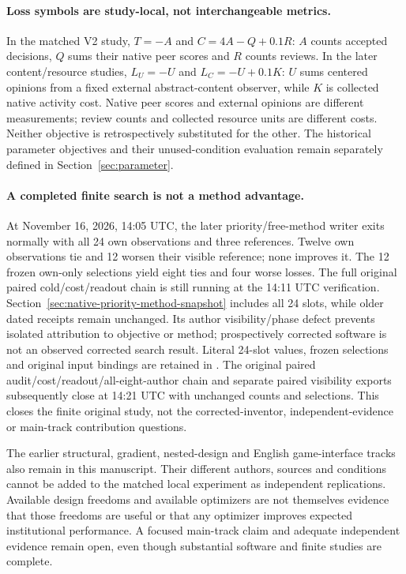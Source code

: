 \paragraph{Loss symbols are study-local, not interchangeable metrics.}
In the matched V2 study, $T=-A$ and $C=4A-Q+0.1R$: $A$ counts accepted
decisions, $Q$ sums their native peer scores and $R$ counts reviews. In the
later content/resource studies, $L_U=-U$ and $L_C=-U+0.1K$: $U$ sums centered
opinions from a fixed external abstract-content observer, while $K$ is
collected native activity cost. Native peer scores and external opinions are
different measurements; review counts and collected resource units are
different costs. Neither objective is retrospectively substituted for the
other. The historical parameter objectives and their unused-condition
evaluation remain separately defined in Section~\ref{sec:parameter}.

\paragraph{A completed finite search is not a method advantage.}
At November 16, 2026, 14:05 UTC, the later priority/free-method writer exits
normally with all 24 own observations and three references. Twelve own
observations tie and 12 worsen their visible reference; none improves it.
The 12 frozen own-only selections yield eight ties and four worse losses.
The full original paired cold/cost/readout chain is still running at the
14:11 UTC verification. Section~\ref{sec:native-priority-method-snapshot}
includes all 24 slots, while older dated receipts remain unchanged. Its author visibility/phase
defect prevents isolated attribution to objective or method; prospectively
corrected software is not an observed corrected search result. Literal
24-slot values, frozen selections and original input bindings are retained in
.
The original paired audit/cost/readout/all-eight-author chain and separate
paired visibility exports subsequently close at 14:21 UTC with unchanged
counts and selections. This closes the finite original study, not the
corrected-inventor, independent-evidence or main-track contribution questions.

The earlier structural, gradient, nested-design and English game-interface
tracks also remain in this manuscript. Their different authors, sources and
conditions cannot be added to the matched local experiment as independent
replications. Available design freedoms and available optimizers are not
themselves evidence that those freedoms are useful or that any optimizer
improves expected institutional performance. A focused main-track claim and
adequate independent evidence remain open, even though substantial software
and finite studies are complete.

